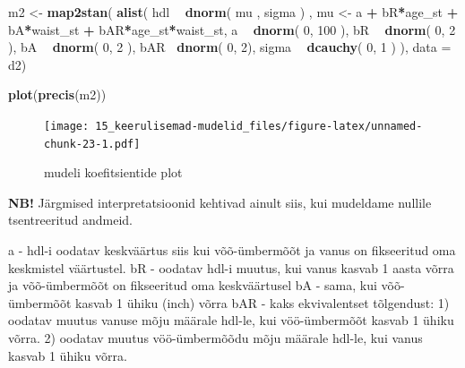 \documentclass[]{book}
\newenvironment{Shaded}{\begin{snugshade}}{\end{snugshade}}
\newcommand{\KeywordTok}[1]{\textcolor[rgb]{0.13,0.29,0.53}{\textbf{#1}}}
\newcommand{\DataTypeTok}[1]{\textcolor[rgb]{0.13,0.29,0.53}{#1}}
\newcommand{\DecValTok}[1]{\textcolor[rgb]{0.00,0.00,0.81}{#1}}
\newcommand{\StringTok}[1]{\textcolor[rgb]{0.31,0.60,0.02}{#1}}
\newcommand{\OperatorTok}[1]{\textcolor[rgb]{0.81,0.36,0.00}{\textbf{#1}}}
\newcommand{\NormalTok}[1]{#1}
\begin{document}
\begin{Shaded}
\begin{Highlighting}[]
\NormalTok{m2 <-}\StringTok{ }\KeywordTok{map2stan}\NormalTok{(}
    \KeywordTok{alist}\NormalTok{(}
\NormalTok{        hdl }\OperatorTok{~}\StringTok{ }\KeywordTok{dnorm}\NormalTok{( mu , sigma ) ,}
\NormalTok{        mu <-}\StringTok{ }\NormalTok{a }\OperatorTok{+}\StringTok{ }\NormalTok{bR}\OperatorTok{*}\NormalTok{age_st }\OperatorTok{+}\StringTok{ }\NormalTok{bA}\OperatorTok{*}\NormalTok{waist_st }\OperatorTok{+}\StringTok{ }\NormalTok{bAR}\OperatorTok{*}\NormalTok{age_st}\OperatorTok{*}\NormalTok{waist_st,}
\NormalTok{        a }\OperatorTok{~}\StringTok{ }\KeywordTok{dnorm}\NormalTok{( }\DecValTok{0}\NormalTok{, }\DecValTok{100}\NormalTok{ ),}
\NormalTok{        bR }\OperatorTok{~}\StringTok{ }\KeywordTok{dnorm}\NormalTok{( }\DecValTok{0}\NormalTok{, }\DecValTok{2}\NormalTok{ ),}
\NormalTok{        bA }\OperatorTok{~}\StringTok{ }\KeywordTok{dnorm}\NormalTok{( }\DecValTok{0}\NormalTok{, }\DecValTok{2}\NormalTok{ ),}
\NormalTok{        bAR}\OperatorTok{~}\StringTok{ }\KeywordTok{dnorm}\NormalTok{( }\DecValTok{0}\NormalTok{, }\DecValTok{2}\NormalTok{),}
\NormalTok{        sigma }\OperatorTok{~}\StringTok{ }\KeywordTok{dcauchy}\NormalTok{( }\DecValTok{0}\NormalTok{, }\DecValTok{1}\NormalTok{ )}
\NormalTok{), }\DataTypeTok{data =}\NormalTok{ d2)}
\end{Highlighting}
\end{Shaded}

\begin{Shaded}
\begin{Highlighting}[]
\KeywordTok{plot}\NormalTok{(}\KeywordTok{precis}\NormalTok{(m2))}
\end{Highlighting}
\end{Shaded}

\begin{figure}
\centering
\texttt{[image: 15\_keerulisemad-mudelid\_files/figure-latex/unnamed-chunk-23-1.pdf]}
\caption{\label{fig:unnamed-chunk-23}mudeli koefitsientide plot}
\end{figure}

\textbf{NB!} Järgmised interpretatsioonid kehtivad ainult siis, kui
mudeldame nullile tsentreeritud andmeid.

a - hdl-i oodatav keskväärtus siis kui võõ-ümbermõõt ja vanus on
fikseeritud oma keskmistel väärtustel. bR - oodatav hdl-i muutus, kui
vanus kasvab 1 aasta võrra ja võõ-ümbermõõt on fikseeritud oma
keskväärtusel bA - sama, kui võõ-ümbermõõt kasvab 1 ühiku (inch) võrra
bAR - kaks ekvivalentset tõlgendust: 1) oodatav muutus vanuse mõju
määrale hdl-le, kui vöö-ümbermõõt kasvab 1 ühiku võrra. 2) oodatav
muutus vöö-ümbermõõdu mõju määrale hdl-le, kui vanus kasvab 1 ühiku
võrra.
\end{document}
